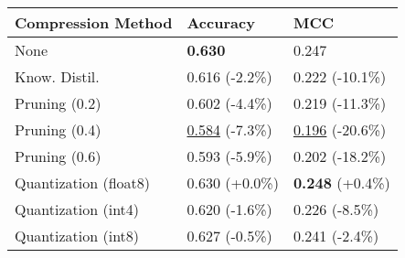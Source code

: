 \begin{tabular}{lll}
\toprule
\textbf{Compression Method} & \textbf{Accuracy} & \textbf{MCC} \\
\midrule
None & \textbf{0.630} & 0.247 \\
Know. Distil. & 0.616 (-2.2\%) & 0.222 (-10.1\%) \\
Pruning (0.2) & 0.602 (-4.4\%) & 0.219 (-11.3\%) \\
Pruning (0.4) & \underline{0.584} (-7.3\%) & \underline{0.196} (-20.6\%) \\
Pruning (0.6) & 0.593 (-5.9\%) & 0.202 (-18.2\%) \\
Quantization (float8) & 0.630 (+0.0\%) & \textbf{0.248} (+0.4\%) \\
Quantization (int4) & 0.620 (-1.6\%) & 0.226 (-8.5\%) \\
Quantization (int8) & 0.627 (-0.5\%) & 0.241 (-2.4\%) \\
\bottomrule
\end{tabular}
